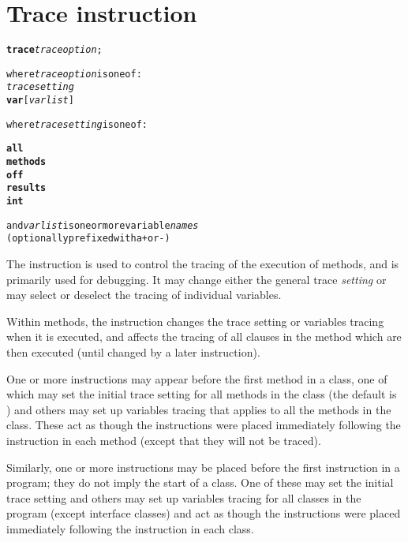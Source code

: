 \section{Trace instruction}\label{reftrace}
\index{,}
\index{,}
\begin{shaded}
\begin{alltt}
\textbf{trace} \emph{traceoption};

where \emph{traceoption} is one of:
    \emph{tracesetting}
    \textbf{var} [\emph{varlist}]

where \emph{tracesetting} is one of:

    \textbf{all}
    \textbf{methods}
    \textbf{off}
    \textbf{results}
    \textbf{int}

    and \emph{varlist} is one or more variable \emph{names}
    (optionally prefixed with a \texttt{+} or \texttt{-})
\end{alltt}
\end{shaded}
 The  instruction is used to control the tracing of the
execution of \nr{} methods, and is primarily used for debugging.
It may change either the general trace \emph{setting} or may select
or deselect the tracing of individual variables.
 
Within methods, the  instruction changes the trace setting
or variables tracing when it is executed, and affects the tracing of
all clauses in the method which are then executed (until changed by a
later  instruction).
 
One or more  instructions may appear before the first
method in a class, one of which may set the initial trace setting
for all methods in the class (the default is ) and others
may set up variables tracing that applies to all the methods in the
class.
These act as though the  instructions were
placed immediately following the  instruction in each
method (except that they will not be traced).
 
Similarly, one or more  instructions may be placed
before the first  instruction in a program; they do not
imply the start of a class.  One of these may set the initial trace
setting and others may set up variables tracing for all classes in
the program (except interface classes) and act as though the
 instructions were placed immediately following the
 instruction in each class.
